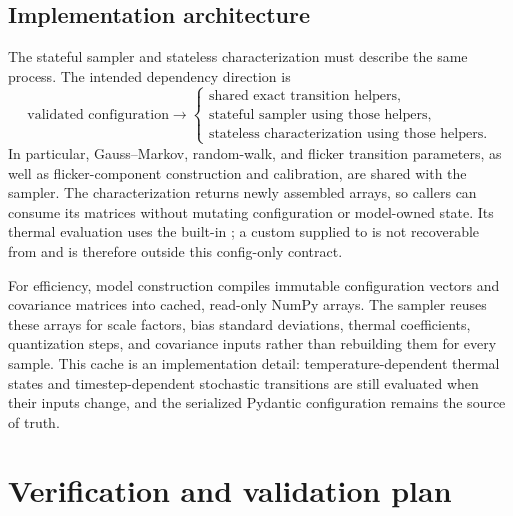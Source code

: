 \documentclass[11pt,oneside,headings=big]{scrreprt}
\begin{document}
    \section{Implementation architecture}
    The stateful sampler and stateless characterization must describe the same
    process. The intended dependency direction is
    \begin{equation}
        \text{validated configuration}
        \longrightarrow
        \begin{cases}
            \text{shared exact transition helpers},\\
            \text{stateful sampler using those helpers},\\
            \text{stateless characterization using those helpers}.
        \end{cases}
    \end{equation}
    In particular, Gauss--Markov, random-walk, and flicker transition parameters,
    as well as flicker-component construction and calibration, are shared with the
    sampler. The characterization returns newly assembled arrays, so callers can
    consume its matrices without mutating configuration or model-owned state. Its
    thermal evaluation uses the built-in ; a custom
     supplied to  is not recoverable from
     and is therefore outside this config-only contract.

    For efficiency, model construction compiles immutable configuration vectors and
    covariance matrices into cached, read-only NumPy arrays. The sampler reuses
    these arrays for scale factors, bias standard deviations, thermal coefficients,
    quantization steps, and covariance inputs rather than rebuilding them for every
    sample. This cache is an implementation detail: temperature-dependent thermal
    states and timestep-dependent stochastic transitions are still evaluated when
    their inputs change, and the serialized Pydantic configuration remains the
    source of truth.


    \chapter{Verification and validation plan}
    \label{chap:verification}
\end{document}
